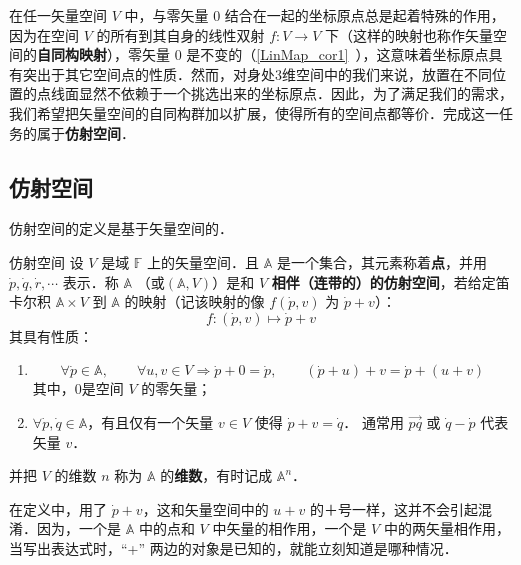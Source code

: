 

在任一矢量空间 $V$ 中，与零矢量 $0$ 结合在一起的坐标原点总是起着特殊的作用，因为在空间 $V$ 的所有到其自身的线性双射 $f:V\rightarrow V$ 下（这样的映射也称作矢量空间的\textbf{自同构映射}），零矢量 $0$ 是不变的（\autoref{LinMap_cor1}~），这意味着坐标原点具有突出于其它空间点的性质．然而，对身处3维空间中的我们来说，放置在不同位置的点线面显然不依赖于一个挑选出来的坐标原点．因此，为了满足我们的需求，我们希望把矢量空间的自同构群加以扩展，使得所有的空间点都等价．完成这一任务的属于\textbf{仿射空间}．
\subsection{仿射空间}\label{AfSp_sub1}
仿射空间的定义是基于矢量空间的．
\begin{definition}{仿射空间}\label{AfSp_def1}
设 $V$ 是域 $\mathbb F$ 上的矢量空间．且 $\mathbb A$ 是一个集合，其元素称着\textbf{点}，并用 $\dot{p},\dot{q},\dot{r},\cdots$ 表示．称 $\mathbb A$ （或$(\mathbb A,V)$）是和 $V$ \textbf{相伴（连带的）的仿射空间}，若给定笛卡尔积 $\mathbb A\times V$ 到 $\mathbb A$ 的映射（记该映射的像 $f(\dot p,v)$ 为 $\dot p+v$）：
\begin{equation}
f:(\dot p,v)\mapsto\dot p+v
\end{equation}
其具有性质：
\begin{enumerate}
\item \begin{equation}
\forall \dot p\in\mathbb A,\qquad
\forall u,v\in V\Rightarrow\dot p+0=\dot p, \qquad
(\dot p+u)+v=\dot p+(u+v)
\end{equation}
其中，0是空间 $V$ 的零矢量；
\item $\forall \dot p,\dot q\in\mathbb A$，有且仅有一个矢量 $v\in V$ 使得 $\dot p+v=\dot q$． 通常用 $\overrightarrow{pq}$ 或 $\dot q-\dot p$ 代表矢量 $v$．
\end{enumerate}
并把 $V$ 的维数 $n$ 称为 $\mathbb A$ 的\textbf{维数}，有时记成 $\mathbb A^n$．
\end{definition}
在定义中，用了 $\dot p+v$，这和矢量空间中的 $u+v$ 的＋号一样，这并不会引起混淆．因为，一个是 $\mathbb A$ 中的点和 $V$ 中矢量的相作用，一个是 $V$ 中的两矢量相作用，当写出表达式时，“+” 两边的对象是已知的，就能立刻知道是哪种情况．

